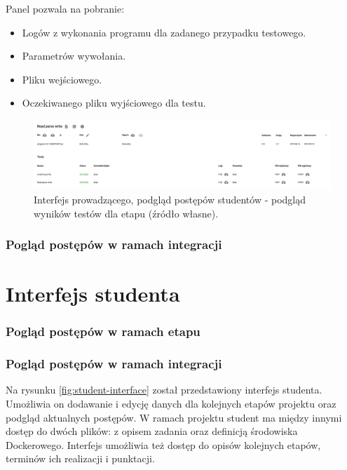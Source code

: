Panel pozwala na pobranie:
\begin{itemize}
    \item Logów z wykonania programu dla zadanego przypadku testowego.
    \item Parametrów wywołania.
    \item Pliku wejściowego.
    \item Oczekiwanego pliku wyjściowego dla testu.
\end{itemize}

\begin{figure}[h]
    \centering
    \includegraphics[width = 13cm]{chapter04/lecturer_preview_stage_tests.png}
    \caption{Interfejs prowadzącego, podgląd postępów studentów - podgląd wyników testów dla etapu (źródło własne).}
    \label{fig:lecturer-preview-stage-tests}
\end{figure}

\subsubsection{Pogląd postępów w ramach integracji}




\section{Interfejs studenta}

\subsubsection{Pogląd postępów w ramach etapu}

\subsubsection{Pogląd postępów w ramach integracji}

Na rysunku \ref{fig:student-interface} został przedstawiony interfejs studenta.
Umożliwia on dodawanie i edycję danych dla kolejnych etapów projektu oraz podgląd aktualnych postępów.
W ramach projektu student ma między innymi dostęp do dwóch plików: z opisem zadania oraz definicją środowiska Dockerowego.
Interfejs umożliwia też dostęp do opisów kolejnych etapów, terminów ich realizacji i punktacji.

